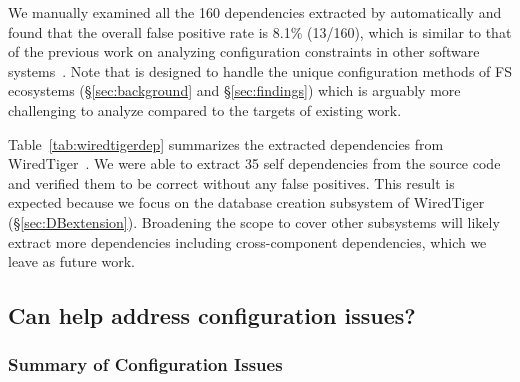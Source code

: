 We manually examined all the 160 dependencies extracted by \prj automatically and found that the overall false positive rate is 8.1\% (13/160), which is similar to that of the previous work on analyzing configuration constraints in other software  systems~\cite{cdep,spex}. Note that \prj is designed to handle the  unique configuration methods of FS ecosystems (\S\ref{sec:background} and \S\ref{sec:findings})  which is arguably more challenging to analyze  compared to the targets of existing work.

 Table~\ref{tab:wiredtigerdep} summarizes the extracted dependencies from WiredTiger~\cite{wt}. We were able to extract 35 self dependencies from the source code and  verified them to be correct without any false positives. This result  is expected because we focus on the database creation subsystem of WiredTiger (\S\ref{sec:DBextension}).  Broadening the scope to cover other subsystems will likely extract   more dependencies including  cross-component dependencies, which we leave as future work.
  
\vspace{-0.1in}
\subsection{Can \prj help address configuration issues?}
\label{sec:results-issues}



\subsubsection{Summary of Configuration Issues}
\label{sec:summary-issues}


